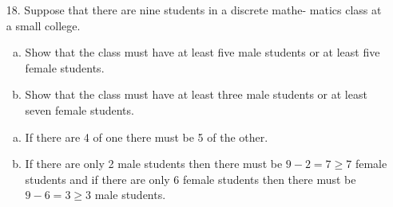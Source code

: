 \begin{itemize}
    \item[18.]  Suppose that there are nine students in a discrete mathe-
          matics class at a small college.
          \begin{enumerate}[a.]
              \item Show that the class must have at least five male students or at least five female students.
              \item Show that the class must have at least three male students or at least seven female students.
          \end{enumerate}
          \answer
          \begin{enumerate}[a.]
              \item If there are 4 of one there must be 5 of the other.
              \item If there are only 2 male students then there must be $9 - 2 = 7 \geq 7$ female students
                    and if there are only 6 female students then there must be $9 - 6 = 3 \geq 3$ male students.
          \end{enumerate}

\end{itemize}


